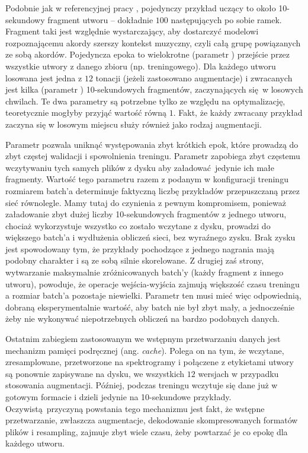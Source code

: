 Podobnie jak w referencyjnej pracy \cite{park_bi-directional_2019}, pojedynczy przykład uczący to
około 10-sekundowy fragment utworu -- dokładnie $100$ następujących po sobie ramek. Fragment taki
jest względnie wystarczający, aby dostarczyć modelowi rozpoznającemu akordy szerszy kontekst
muzyczny, czyli całą grupę powiązanych ze sobą akordów. Pojedyncza epoka to wielokrotne (parametr
) przejście przez wszystkie utwory z danego zbioru (np. treningowego). Dla
każdego utworu losowana jest jedna z $12$ tonacji (jeżeli zastosowano augmentacje) i zwracanych jest
kilka (parametr ) 10-sekundowych fragmentów, zaczynających się w losowych
chwilach. Te dwa parametry są potrzebne tylko ze względu na optymalizację, teoretycznie mogłyby przyjąć
wartość równą $1$. Fakt, że każdy zwracany przykład zaczyna się w losowym miejscu służy również jako
rodzaj augmentacji.

Parametr  pozwala uniknąć występowania zbyt krótkich epok, które prowadzą do
zbyt częstej walidacji i spowolnienia treningu. Parametr  zapobiega zbyt
częstemu wczytywaniu tych samych plików z dysku aby załadować jedynie ich małe fragmenty. Wartość
tego parametru razem z podanym w konfiguracji treningu rozmiarem batch'a determinuje faktyczną
liczbę przykładów przepuszczaną przez sieć równolegle. Mamy tutaj do czynienia z pewnym kompromisem,
ponieważ załadowanie zbyt dużej liczby 10-sekundowych fragmentów z jednego utworu, chociaż
wykorzystuje wszystko co zostało wczytane z dysku, prowadzi do większego batch'a i wydłużenia
obliczeń sieci, bez wyraźnego zysku. Brak zysku jest spowodowany tym, że przykłady pochodzące z
jednego nagrania mają podobny charakter i są ze sobą silnie skorelowane. Z drugiej zaś strony,
wytwarzanie maksymalnie zróżnicowanych batch'y (każdy fragment z innego utworu), powoduje, że
operacje wejścia-wyjścia zajmują większość czasu treningu a rozmiar batch'a pozostaje niewielki.
Parametr ten musi mieć więc odpowiednią, dobraną eksperymentalnie wartość, aby batch nie był zbyt
mały, a jednocześnie żeby nie wykonywać niepotrzebnych obliczeń na bardzo podobnych danych.

Ostatnim zabiegiem zastosowanym we wstępnym przetwarzaniu danych jest mechanizm pamięci podręcznej
(ang. \emph{cache}). Polega on na tym, że wczytane, zresamplowane, przetworzone na spektrogramy i
połączene z etykietami utwory są ponownie zapisywane na dysku, we wszystkich $12$ wersjach w
przypadku stosowania augmentacji. Później, podczas treningu wczytuje się dane już w gotowym formacie
i dzieli jedynie na 10-sekundowe przykłady. Oczywistą przyczyną powstania tego mechanizmu jest fakt,
że wstępne przetwarzanie, zwłaszcza augmentacje, dekodowanie skompresowanych formatów plików i
resampling, zajmuje zbyt wiele czasu, żeby powtarzać je co epokę dla każdego utworu.
